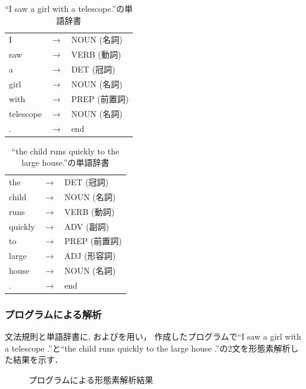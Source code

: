 \documentclass[uplatex, dvipdfmx, a4paper, twocolumn]{jsarticle}
\begin{document}
      \begin{table}[htb]
        \centering
        \caption{``I saw a girl with a telescope.''の単語辞書}
        \label{tab:dict_girl_network}
        \begin{tabular}{l c l} \hline
          I & $\to$ & NOUN (名詞) \\
          saw & $\to$ & VERB (動詞) \\
          a & $\to$ & DET (冠詞) \\
          girl & $\to$ & NOUN (名詞) \\
          with & $\to$ & PREP (前置詞) \\
          telescope & $\to$ & NOUN (名詞) \\
          . & $\to$ & end \\ \hline
        \end{tabular}
      \end{table}
      \begin{table}[htb]
        \centering
        \caption{``the child runs quickly to the large house.''の単語辞書}
        \label{tab:dict_child_network}
        \begin{tabular}{l c l} \hline
          the & $\to$ & DET (冠詞) \\
          child & $\to$ & NOUN (名詞) \\
          runs & $\to$ & VERB (動詞) \\
          quickly & $\to$ & ADV (副詞) \\
          to & $\to$ & PREP (前置詞) \\
          large & $\to$ & ADJ (形容詞) \\
          house & $\to$ & NOUN (名詞) \\
          . & $\to$ & end \\ \hline
        \end{tabular}
      \end{table}

      \subsubsection{プログラムによる解析}
      文法規則と単語辞書に, およびを用い，
      作成したプログラムで``I saw a girl with a telescope .''と``the child runs quickly to the large house .''の2文を形態素解析した結果を示す．
      \begin{figure}[htpb]
        \centering
        \caption{プログラムによる形態素解析結果}
        \label{fig:result_network}
      \end{figure}
\end{document}
